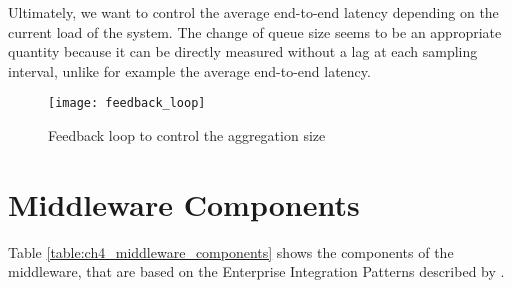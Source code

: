 Ultimately, we want to control the average end-to-end latency depending on the current load of the system. The change of queue size seems to be an appropriate quantity because it can be directly measured without a lag at each sampling interval, unlike for example the average end-to-end latency.

\begin{figure}[htbp]
	\centering
	\texttt{[image: feedback\_loop]}
	\caption{Feedback loop to control the aggregation size}
	\label{fig:feedback_loop}
\end{figure}

\section{Middleware Components}
\label{sec:ch05_middleware_components}
Table \ref{table:ch4_middleware_components} shows the components of the middleware, that are based on the Enterprise Integration Patterns described by \cite{Hohpe:2003fk}.

